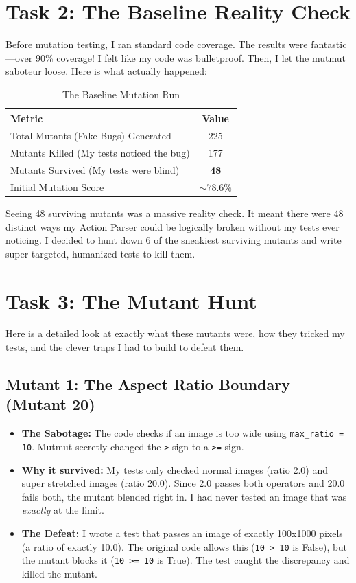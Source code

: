 \documentclass[a4paper,12pt]{article}
\begin{document}
\section{Task 2: The Baseline Reality Check}
Before mutation testing, I ran standard code coverage. The results were fantastic—over 90\% coverage! I felt like my code was bulletproof. Then, I let the mutmut saboteur loose. Here is what actually happened:

\begin{table}[h!]
\centering
\caption{The Baseline Mutation Run}
\begin{tabular}{|l|c|}
\hline
\textbf{Metric} & \textbf{Value} \\ \hline
Total Mutants (Fake Bugs) Generated & 225 \\ \hline
Mutants Killed (My tests noticed the bug) & 177 \\ \hline
Mutants Survived (My tests were blind) & \textbf{48} \\ \hline
Initial Mutation Score & $\sim 78.6\%$ \\ \hline
\end{tabular}
\end{table}

Seeing 48 surviving mutants was a massive reality check. It meant there were 48 distinct ways my Action Parser could be logically broken without my tests ever noticing. I decided to hunt down 6 of the sneakiest surviving mutants and write super-targeted, humanized tests to kill them.

\section{Task 3: The Mutant Hunt}
Here is a detailed look at exactly what these mutants were, how they tricked my tests, and the clever traps I had to build to defeat them.

\subsection{Mutant 1: The Aspect Ratio Boundary (Mutant 20)}
\begin{itemize}
    \item \textbf{The Sabotage:} The code checks if an image is too wide using \verb|max_ratio = 10|. Mutmut secretly changed the \verb|>| sign to a \verb|>=| sign.
    \item \textbf{Why it survived:} My tests only checked normal images (ratio 2.0) and super stretched images (ratio 20.0). Since 2.0 passes both operators and 20.0 fails both, the mutant blended right in. I had never tested an image that was \textit{exactly} at the limit.
    \item \textbf{The Defeat:} I wrote a test that passes an image of exactly 100x1000 pixels (a ratio of exactly 10.0). The original code allows this (\verb|10 > 10| is False), but the mutant blocks it (\verb|10 >= 10| is True). The test caught the discrepancy and killed the mutant.
\end{itemize}
\end{document}

